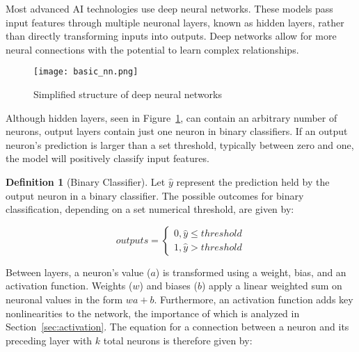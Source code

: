 \documentclass{article}
\theoremstyle{definition}
\newtheorem{definition}{Definition}[section]
\begin{document}
Most advanced AI technologies use deep neural networks. These models pass input features through multiple neuronal layers, known as hidden layers, rather than directly transforming inputs into outputs. Deep networks allow for more neural connections with the potential to learn complex relationships. 

\begin{figure}[H]
    \centering
    \texttt{[image: basic\_nn.png]}
    \caption{Simplified structure of deep neural networks \cite{nn_book}}
    \label{fig:Figure 1}
\end{figure}

Although hidden layers, seen in Figure~\ref{fig:Figure 1}, can contain an arbitrary number of neurons, output layers  contain just one neuron in binary classifiers. If an output neuron's prediction is larger than a set threshold, typically between zero and one, the model will  positively classify input features. 
\begin{definition}[Binary Classifier]
\label{bclassdefinition}
Let $\hat{y}$ represent the prediction held by the output neuron in a binary classifier. The possible outcomes for binary classification, depending on a set numerical threshold, are given by:

\begin{equation*}
outputs = \begin{cases}
0,  \hat{y} \leq threshold \\
1,  \hat{y} > threshold
\end{cases}
\end{equation*}

\end{definition}
Between layers, a neuron's value ($a$) is transformed using a weight, bias, and an activation function. Weights ($w$) and biases ($b$) apply a linear weighted sum on neuronal values in the form $wa + b$. Furthermore, an activation function adds key nonlinearities to the network, the importance of which is analyzed in Section~\ref{sec:activation}. The equation for a  connection between a neuron and its preceding layer with $k$ total neurons is therefore given by:
\end{document}
